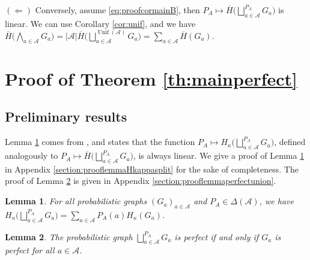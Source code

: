 \documentclass[conference,a4paper]{IEEEtran}
\DeclareMathOperator*{\Unif}{Unif}
\newtheorem{lemma}{Lemma}
\begin{document}
$(\Longleftarrow)$ Conversely, assume \eqref{eq:proofcormainB}, then $P_A \mapsto \overline{H}\big(\bigsqcup_{a \in \mathcal{A}}^{P_A} G_a\big)$ is linear. We can use Corollary \ref{cor:unif}, and we have $\overline{H}\big( \bigwedge_{a \in \mathcal{A}} G_a \big) = |\mathcal{A}|\overline{H}\big(\bigsqcup_{a \in \mathcal{A}}^{\Unif(\mathcal{A})} G_a\big) = \sum_{a \in \mathcal{A}} \overline{H}(G_{a})$.

\section{Proof of Theorem \ref{th:mainperfect}}\label{section:proofthmainperfect}

\subsection{Preliminary results}

Lemma \ref{lemma:Hkappasplit} comes from \cite[Corollary 3.4]{simonyi1995graph}, and states that the function $P_A \mapsto H_\kappa\big(\bigsqcup_{a \in \mathcal{A}}^{P_A} G_a \big)$, defined analogously to $P_A \mapsto \overline{H}\big(\bigsqcup_{a \in \mathcal{A}}^{P_A} G_a \big)$, is always linear. 
We give a proof of Lemma \ref{lemma:Hkappasplit} in Appendix \ref{section:prooflemmaHkappasplit} for the sake of completeness. The proof of Lemma \ref{lemma:perfectunion} is given in Appendix \ref{section:prooflemmaperfectunion}.

\begin{lemma}\label{lemma:Hkappasplit}
For all probabilistic graphs $(G_a)_{a \in \mathcal{A}}$ and $P_A \in \Delta(\mathcal{A})$, we have $H_\kappa\big(\bigsqcup_{a\in\mathcal{A}}^{P_A} G_a \big) = \sum_{a \in \mathcal{A}} P_A(a) H_\kappa(G_a)$.
\end{lemma}

\begin{lemma}\label{lemma:perfectunion}
    The probabilistic graph $\bigsqcup_{a\in\mathcal{A}}^{P_A} G_a$ is perfect if and only if  $G_a$ is perfect for all $a \in \mathcal{A}$.
\end{lemma}
\end{document}
